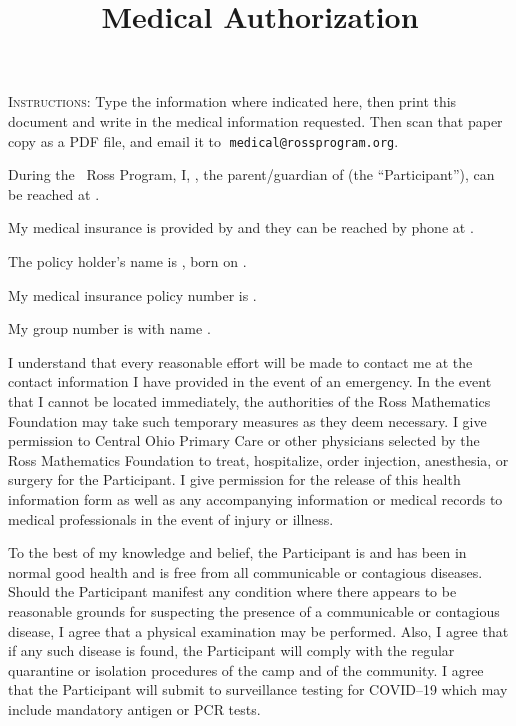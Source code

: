 \documentclass{ross}
\title{Medical Authorization}
\begin{document}
\maketitle

\textsc{Instructions:} Type the information where indicated here, 
then print this document and write in the medical information requested.
Then scan that paper copy as a PDF file, and email it to$\;$ \texttt{medical@rossprogram.org}.

During the \the\year\ Ross Program, I, , 
the parent/guardian of  (the ``Participant''), 
can be reached at .

My medical insurance is provided by  
and they can be reached by phone at .

The policy holder's name is , born on .

My medical insurance policy number is .

My group number is  with name .

I understand that every reasonable effort will be made to contact me
at the contact information I have provided in the event of an
emergency.  In the event that I cannot be located immediately, the
authorities of the Ross Mathematics Foundation may take such temporary
measures as they deem necessary.  I give permission to Central Ohio
Primary Care or other physicians selected by the Ross Mathematics
Foundation to treat, hospitalize, order injection, anesthesia, or surgery
for the Participant.  I give permission for the release of this health
information form as well as any accompanying information or medical
records to medical professionals in the event of injury or illness.

To the best of my knowledge and belief, the Participant is and has
been in normal good health and is free from all communicable or
contagious diseases. Should the Participant manifest any condition
where there appears to be reasonable grounds for suspecting the
presence of a communicable or contagious disease, I agree that a
physical examination may be performed. Also, I agree that if any such
disease is found, the Participant will comply with the regular
quarantine or isolation procedures of the camp and of the community.
I agree that the Participant will submit to surveillance testing for
COVID--19 which may include mandatory antigen or PCR tests.
\end{document}
